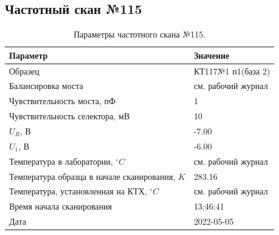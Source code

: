 \subsection{Частотный скан №115}
\begin{table}[!ht]
    \centering
    \caption{Параметры частотного скана №115.}
    \begin{tabular}{|l|l|}
        \hline
        Параметр                                       & Значение                  \\ \hline
        Образец                                        & КТ117№1 п1(база 2)        \\ \hline
        Балансировка моста                             & см. рабочий журнал        \\ \hline
        Чувствительность моста, пФ                     & 1                         \\ \hline
        Чувствительность селектора, мВ                 & 10                        \\ \hline
        $U_R$, В                                       & -7.00                     \\ \hline
        $U_1$, В                                       & -6.00                     \\ \hline
        Температура в лаборатории, $^\circ C$          & см. рабочий журнал        \\ \hline
        Температура образца в начале сканирования, $K$ & 283.16                    \\ \hline
        Температура, установленная на КТХ, $^\circ C$  & см. рабочий журнал        \\ \hline
        Время начала сканирования                      & 13:46:41                  \\ \hline
        Дата                                           & 2022-05-05                \\ \hline
    \end{tabular}
    \label{table:frequency_scan_115}
\end{table}

